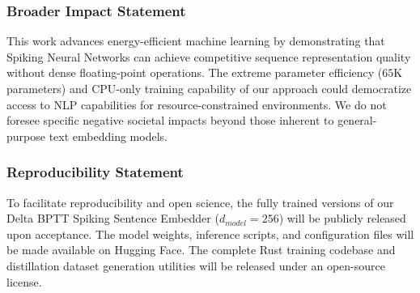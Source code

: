 \documentclass[11pt, conference, compsoc, twoside]{IEEEtran}
\begin{document}
\subsubsection*{Broader Impact Statement}
This work advances energy-efficient machine learning by demonstrating that Spiking Neural Networks can achieve competitive sequence representation quality without dense floating-point operations. The extreme parameter efficiency ($65$K parameters) and CPU-only training capability of our approach could democratize access to NLP capabilities for resource-constrained environments. We do not foresee specific negative societal impacts beyond those inherent to general-purpose text embedding models.

\subsubsection*{Reproducibility Statement}
To facilitate reproducibility and open science, the fully trained versions of our Delta BPTT Spiking Sentence Embedder ($d_{model} = 256$) will be publicly released upon acceptance. The model weights, inference scripts, and configuration files will be made available on Hugging Face. The complete Rust training codebase and distillation dataset generation utilities will be released under an open-source license.
\end{document}

